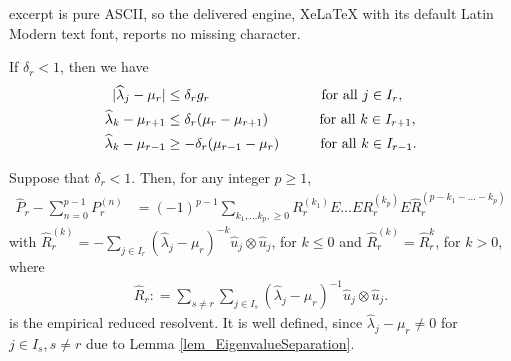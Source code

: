 \documentclass[10pt,a4paper]{amsart}
\begin{document}
excerpt is pure ASCII, so the delivered engine, XeLaTeX with its default Latin Modern text font, reports no missing character.
\begin{lemma}%
  \label{lem_EigenvalueSeparation}
  If \( \delta_{r} < 1 \), then we have 
  \begin{align}
            | \widehat{ \lambda }_{j} - \mu_{r} | 
    & \le
            \delta_{r} g_{r} 
            \qquad \qquad \qquad
            \qquad \text{for all } j \in I_{r},
    \\
            \widehat{ \lambda }_{k} - \mu_{r + 1} 
    & \le 
            \delta_{r} ( \mu_{r} - \mu_{r + 1} ) 
            \quad \qquad \ \ \text{for all } k \in I_{r + 1},
    \notag
    \\
            \widehat{ \lambda }_{k} - \mu_{r - 1} 
    & \ge
            - \delta_{r} ( \mu_{r - 1} - \mu_{r} ) 
            \qquad \ \ \; \text{for all } k \in I_{r - 1}.
    \notag
  \end{align}
\end{lemma}%

\begin{lemma}%
  \label{lem_TaylorRemainder}
  Suppose that \( \delta_{r} < 1 \).
  Then, for any integer \( p \ge 1 \), 
  \begin{align}
    \label{eq_A_TaylorRemainder}
        \widehat{P}_{r} - \sum_{n = 0}^{p - 1} P_{r}^{ (n) }
    & = 
        (-1)^{p - 1} 
        \sum_{k_{1}, \dots k_{p}, \ge 0} 
        R_{r}^{ ( k_{1} ) } E \dots E R_{r}^{ ( k_{p} ) } 
        E \widehat{R}_{r}^{ ( p - k_{1} - \dots - k_{p} ) }
  \end{align}
  with 
  \( 
    \widehat{R}_{r}^{ (k) } = - \sum_{ j \in I_{r} }  
                                ( \widehat{ \lambda }_{j} - \mu_{r} )^{ - k }
                                \widehat{u}_{j} \otimes \widehat{u}_{j} 
  \),
  for \( k \le 0 \) and \( \widehat{R}_{r}^{ (k) } = \widehat{R}_{r} ^{k} \),
  for  \( k > 0 \), where 
  \begin{align}
    \widehat{R}_{r}: = \sum_{ s \ne r } \sum_{ j \in I_{s} } 
                       ( \widehat{ \lambda }_{j} - \mu_{r}  )^{-1} 
                       \widehat{u}_{j} \otimes \widehat{u}_{j}.
  \end{align}
  is the empirical reduced resolvent.
  It is well defined, since \( \widehat{ \lambda }_{j} - \mu_{r} \ne 0 \) for 
  \( j \in I_{s}, s \ne r \)  due to Lemma 
  \normalfont \ref{lem_EigenvalueSeparation}.
\end{lemma}%
\end{document}
